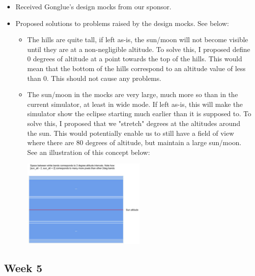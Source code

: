 \documentclass[10pt, onecolumn, draftclsnofoot, letterpaper, compsoc]{IEEEtran}
\begin{document}
    \begin{itemize}

    \item Received Gonglue's design mocks from our sponsor.

	\item Proposed solutions to problems raised by the design mocks. See below:

		\begin{itemize}

		\item The hills are quite tall, if left as-is, the sun/moon will not become
			  visible until they are at a non-negligible altitude. To solve this,
			  I proposed define 0 degrees of altitude at a point towards the top of the
			  hills. This would mean that the bottom of the hills correspond to an altitude
			  value of less than 0. This should not cause any problems.

		\item The sun/moon in the mocks are very large, much more so than in the current
			  simulator, at least in wide mode. If left as-is, this will make the simulator
			  show the eclipse starting much earlier than it is supposed to. To solve this, I
			  proposed that we "stretch" degrees at the altitudes around the sun. This would
			  potentially enable us to still have a field of view where there are 80 degrees
			  of altitude, but maintain a large sun/moon. See an illustration of this concept below:

			  \begin{center}
			  	\includegraphics[width=0.5\textwidth]{angle.eps}
			  \end{center}

		\end{itemize}

    \end{itemize}

\subsection{Week 5}
\end{document}
